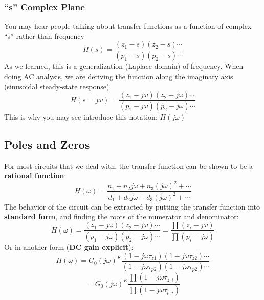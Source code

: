 \subsubsection{“s” Complex Plane}
You may hear people talking about transfer functions as a function of complex “s” rather than frequency
\begin{equation}
	H(s) = \frac{{({z_1} - s)({z_2} - s) \cdots }}{{({p_1} - s)({p_2} - s) \cdots }}
\end{equation}
As we learned, this is a generalization (Laplace domain) of frequency. When doing AC analysis, we are deriving the function along the imaginary axis (sinusoidal steady-state response)
\begin{equation}
	H(s = j\omega ) = \frac{{({z_1} - j\omega )({z_2} - j\omega ) \cdots }}{{({p_1} - j\omega )({p_2} - j\omega ) \cdots }}
\end{equation}
This is why you may see introduce this notation:  $H(j\omega )$
\subsection{Poles and Zeros}
For most circuits that we deal with, the transfer function can be shown to be a \textbf{rational function}:
\begin{equation}
	H(\omega ) = \frac{{{n_1} + {n_2}j\omega  + {n_3}{{(j\omega )}^2} +  \cdots }}{{{d_1} + {d_2}j\omega  + {d_3}{{(j\omega )}^2} +  \cdots }}
\end{equation}
The behavior of the circuit can be extracted by putting the transfer function into \textbf{standard form}, and finding the roots of the numerator and denominator:
\begin{equation} 
	H(\omega ) = \frac{{({z_1} - j\omega )({z_2} - j\omega ) \cdots }}{{({p_1} - j\omega )({p_2} - j\omega ) \cdots }} = \frac{{\prod {({z_i} - j\omega )} }}{{\prod {({p_i} - j\omega )} }}
\end{equation}
Or in another form (\textbf{DC gain explicit}):
\begin{equation}
	H(\omega ) = {G_0}{(j\omega )^K}\frac{{(1 - j\omega {\tau _{z1}})(1 - j\omega {\tau _{z2}}) \cdots }}{{(1 - j\omega {\tau _{p2}})(1 - j\omega {\tau _{p2}}) \cdots }}
\end{equation}	
\begin{equation} = {G_0}{(j\omega )^K}\frac{{\prod {(1 - j\omega {\tau _{z,i}})} }}{{\prod {(1 - j\omega {\tau _{p,i}})} }}
\end{equation}
